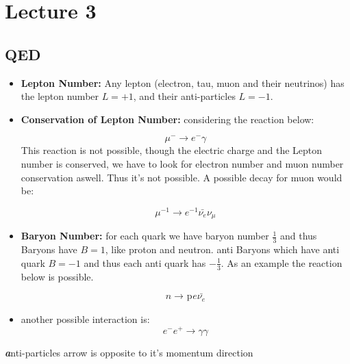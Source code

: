 \documentclass[10pt,a4paper]{article}
\newenvironment{callout}
	{\begin{calloutbox}\color{charcoal}\textbf\textit}
	{\end{calloutbox}}
\newcommand{\ch}[5]{{}^{#2}_{#3}\!\text{#1}^{#4}_{#5}}
\newcommand{\proton}{\ch{p}{}{}{}{}}
\begin{document}
     \section{Lecture 3}
          \subsection{QED}
          \begin{itemize}
               \item \textbf{Lepton Number:} Any lepton (electron, tau, muon and their neutrinos) has the lepton number $L = +1$, and their anti-particles $L = - 1$. 
               \item \textbf{Conservation of Lepton Number:} considering the reaction below:

          
          \begin{equation}
          \mu^{-} \rightarrow e^{-} \gamma
          \end{equation}
          This reaction is not possible, though the electric charge and the Lepton number is conserved, we have to look for electron number and muon number conservation aswell. Thus it's not possible. A possible decay for muon would be:

          
          \begin{equation}
               \mu^{-1} \rightarrow e^{-1} \bar{\nu_{e}}  \nu_{\mu}
          \end{equation}

          \item \textbf{Baryon Number:} for each quark we have baryon number $\frac13$ and thus Baryons have $B=1$, like proton and neutron. anti Baryons which have anti quark $B=-1$ and thus each anti quark has $-\frac13$. As an example the reaction below is possible.

          \begin{equation}
               n \rightarrow\proton e \bar{\nu_{e}} 
          \end{equation}

          \item another possible interaction is:
          \begin{equation}
               e^{-}e^{+} \rightarrow \gamma \gamma
          \end{equation}
          

          \end{itemize}
          \begin{callout}
               anti-particles arrow is opposite to it's momentum direction
          \end{callout}
\end{document}
